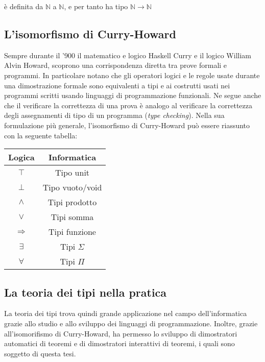 \documentclass[12pt,a4paper]{report}
\begin{document}
è definita da $\mathbb{N}$ a $\mathbb{N}$, e per tanto ha tipo $\mathbb{N} \rightarrow \mathbb{N}$

\subsection{L'isomorfismo di Curry-Howard}
Sempre durante il '900 il matematico e logico Haskell Curry e il logico William Alvin Howard,
scoprono una corrispondenza diretta tra prove formali e programmi. In particolare notano che
gli operatori logici e le regole usate durante una dimostrazione formale sono equivalenti a
tipi e ai costrutti usati nei programmi scritti usando linguaggi di programmazione funzionali.
Ne segue anche che il verificare la correttezza di una prova è analogo al verificare la correttezza
degli assegnamenti di tipo di un programma (\textit{type checking}). Nella sua formulazione più
generale, l'isomorfismo di Curry-Howard può essere riassunto con la seguente tabella:

\begin{center}
  \begin{tabular}{ | c | c |}
    \hline
    \textbf{Logica} & \textbf{Informatica} \\
    \hline
    $\top$ & Tipo unit \\
    \hline
    $\bot $ & Tipo vuoto/void \\
    \hline
   $\wedge$ & Tipi prodotto \\  
    \hline
   $\vee$ & Tipi somma \\
    \hline
   $\Rightarrow$ & Tipi funzione \\ 
    \hline
   $\exists$ & Tipi $\Sigma$ \\ 
    \hline
    $\forall $ & Tipi $\Pi$ \\ 
    \hline

  \end{tabular}
\end{center}

\subsection{La teoria dei tipi nella pratica}
La teoria dei tipi trova quindi grande applicazione nel campo dell'informatica grazie
allo studio e allo sviluppo dei linguaggi di programmazione. Inoltre, grazie all'isomorifismo
di Curry-Howard, ha permesso lo sviluppo di dimostratori automatici di teoremi e
di dimostratori interattivi di teoremi, i quali sono soggetto di questa tesi.
\end{document}
